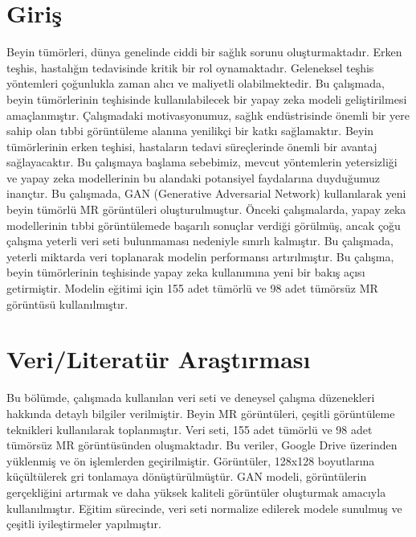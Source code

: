 \documentclass[10pt]{article}
\begin{document}
	\section{Giriş}
	Beyin tümörleri, dünya genelinde ciddi bir sağlık sorunu oluşturmaktadır. Erken teşhis, hastalığın tedavisinde kritik bir rol oynamaktadır. Geleneksel teşhis yöntemleri çoğunlukla zaman alıcı ve maliyetli olabilmektedir. Bu çalışmada, beyin tümörlerinin teşhisinde kullanılabilecek bir yapay zeka modeli geliştirilmesi amaçlanmıştır. Çalışmadaki motivasyonumuz, sağlık endüstrisinde önemli bir yere sahip olan tıbbi görüntüleme alanına yenilikçi bir katkı sağlamaktır. Beyin tümörlerinin erken teşhisi, hastaların tedavi süreçlerinde önemli bir avantaj sağlayacaktır. Bu çalışmaya başlama sebebimiz, mevcut yöntemlerin yetersizliği ve yapay zeka modellerinin bu alandaki potansiyel faydalarına duyduğumuz inançtır. Bu çalışmada, GAN (Generative Adversarial Network) kullanılarak yeni beyin tümörlü MR görüntüleri oluşturulmuştur. Önceki çalışmalarda, yapay zeka modellerinin tıbbi görüntülemede başarılı sonuçlar verdiği görülmüş, ancak çoğu çalışma yeterli veri seti bulunmaması nedeniyle sınırlı kalmıştır. Bu çalışmada, yeterli miktarda veri toplanarak modelin performansı artırılmıştır. Bu çalışma, beyin tümörlerinin teşhisinde yapay zeka kullanımına yeni bir bakış açısı getirmiştir. Modelin eğitimi için 155 adet tümörlü ve 98 adet tümörsüz MR görüntüsü kullanılmıştır.
	
	\section{Veri/Literatür Araştırması}
	Bu bölümde, çalışmada kullanılan veri seti ve deneysel çalışma düzenekleri hakkında detaylı bilgiler verilmiştir. Beyin MR görüntüleri, çeşitli görüntüleme teknikleri kullanılarak toplanmıştır. Veri seti, 155 adet tümörlü ve 98 adet tümörsüz MR görüntüsünden oluşmaktadır. Bu veriler, Google Drive üzerinden yüklenmiş ve ön işlemlerden geçirilmiştir. Görüntüler, 128x128 boyutlarına küçültülerek gri tonlamaya dönüştürülmüştür. GAN modeli, görüntülerin gerçekliğini artırmak ve daha yüksek kaliteli görüntüler oluşturmak amacıyla kullanılmıştır. Eğitim sürecinde, veri seti normalize edilerek modele sunulmuş ve çeşitli iyileştirmeler yapılmıştır.
	
\end{document}
